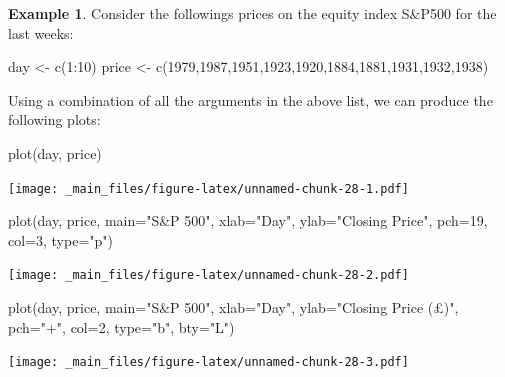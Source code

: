 \documentclass[
]{book}
\newenvironment{Shaded}{\begin{snugshade}}{\end{snugshade}}
\newcommand{\AttributeTok}[1]{\textcolor[rgb]{0.77,0.63,0.00}{#1}}
\newcommand{\DecValTok}[1]{\textcolor[rgb]{0.00,0.00,0.81}{#1}}
\newcommand{\FunctionTok}[1]{\textcolor[rgb]{0.00,0.00,0.00}{#1}}
\newcommand{\NormalTok}[1]{#1}
\newcommand{\OtherTok}[1]{\textcolor[rgb]{0.56,0.35,0.01}{#1}}
\newcommand{\SpecialCharTok}[1]{\textcolor[rgb]{0.00,0.00,0.00}{#1}}
\newcommand{\StringTok}[1]{\textcolor[rgb]{0.31,0.60,0.02}{#1}}
\theoremstyle{definition}
\theoremstyle{definition}
\newtheorem{example}{Example}[chapter]
\theoremstyle{definition}
\theoremstyle{definition}
\theoremstyle{remark}
\begin{document}
\begin{example}
Consider the followings prices on the equity index S\&P500 for the last weeks:

\begin{Shaded}
\begin{Highlighting}[]
\NormalTok{day }\OtherTok{\textless{}{-}} \FunctionTok{c}\NormalTok{(}\DecValTok{1}\SpecialCharTok{:}\DecValTok{10}\NormalTok{)}
\NormalTok{price }\OtherTok{\textless{}{-}} \FunctionTok{c}\NormalTok{(}\DecValTok{1979}\NormalTok{,}\DecValTok{1987}\NormalTok{,}\DecValTok{1951}\NormalTok{,}\DecValTok{1923}\NormalTok{,}\DecValTok{1920}\NormalTok{,}\DecValTok{1884}\NormalTok{,}\DecValTok{1881}\NormalTok{,}\DecValTok{1931}\NormalTok{,}\DecValTok{1932}\NormalTok{,}\DecValTok{1938}\NormalTok{)}
\end{Highlighting}
\end{Shaded}

Using a combination of all the arguments in the above list, we can produce the following plots:

\begin{Shaded}
\begin{Highlighting}[]
\FunctionTok{plot}\NormalTok{(day, price)}
\end{Highlighting}
\end{Shaded}

\texttt{[image: \_main\_files/figure-latex/unnamed-chunk-28-1.pdf]}

\begin{Shaded}
\begin{Highlighting}[]
\FunctionTok{plot}\NormalTok{(day, price,}
     \AttributeTok{main=}\StringTok{"S\&P 500"}\NormalTok{,}
     \AttributeTok{xlab=}\StringTok{"Day"}\NormalTok{,}
     \AttributeTok{ylab=}\StringTok{"Closing Price"}\NormalTok{,}
     \AttributeTok{pch=}\DecValTok{19}\NormalTok{,}
     \AttributeTok{col=}\DecValTok{3}\NormalTok{,}
     \AttributeTok{type=}\StringTok{"p"}\NormalTok{)}
\end{Highlighting}
\end{Shaded}

\texttt{[image: \_main\_files/figure-latex/unnamed-chunk-28-2.pdf]}

\begin{Shaded}
\begin{Highlighting}[]
\FunctionTok{plot}\NormalTok{(day, price,}
     \AttributeTok{main=}\StringTok{"S\&P 500"}\NormalTok{,}
     \AttributeTok{xlab=}\StringTok{"Day"}\NormalTok{,}
     \AttributeTok{ylab=}\StringTok{"Closing Price (£)"}\NormalTok{,}
     \AttributeTok{pch=}\StringTok{"+"}\NormalTok{,}
     \AttributeTok{col=}\DecValTok{2}\NormalTok{,}
     \AttributeTok{type=}\StringTok{"b"}\NormalTok{,}
     \AttributeTok{bty=}\StringTok{"L"}\NormalTok{)}
\end{Highlighting}
\end{Shaded}

\texttt{[image: \_main\_files/figure-latex/unnamed-chunk-28-3.pdf]}
\end{example}
\end{document}
